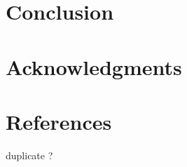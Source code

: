 \documentclass[11pt,a4paper,1p,sort&compress]{elsarticle}
\begin{document}
\section*{Conclusion}
\label{sec:Conclusion}


\section*{Acknowledgments}
\label{sec:Acknowledgments}
\section*{References}
\label{sec:References}
duplicate ?




\nocite{*}
\end{document}
